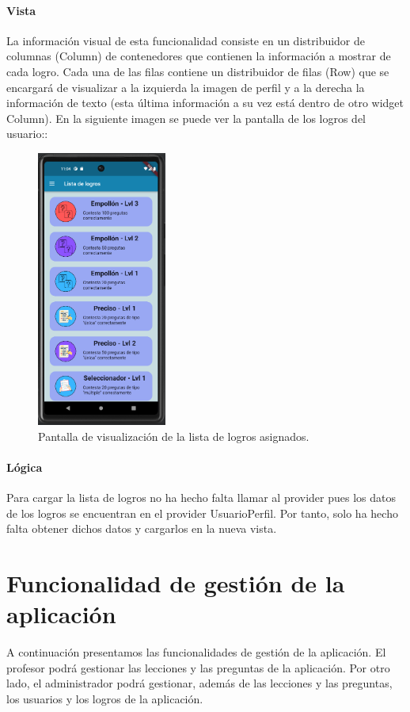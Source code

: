 \paragraph*{Vista}
La información visual de esta funcionalidad consiste en un distribuidor de columnas (Column) de contenedores que contienen la información a mostrar de cada logro. 
Cada una de las filas contiene un distribuidor de filas (Row) que se encargará de visualizar a la izquierda la imagen de perfil y
 a la derecha la información de texto (esta última información a su vez está dentro de otro widget Column). 
 En la siguiente imagen se puede ver la pantalla de los logros del usuario:: 


\begin{figure}[H]
  \centering
  \includegraphics[width=0.38\textwidth]{imagenes/c7/listalogrosperfil.png}
  \caption{Pantalla de visualización de la lista de logros asignados.} 
  \label{fig:ver_logros_perfil}
\end{figure}



\paragraph*{Lógica}
Para cargar la lista de logros no ha hecho falta llamar al provider pues los datos de los logros se encuentran en el provider UsuarioPerfil.
Por tanto, solo ha hecho falta obtener dichos datos y cargarlos en la nueva vista.


\section{Funcionalidad de gestión de la aplicación}
A continuación presentamos las funcionalidades de gestión de la aplicación. 
El profesor podrá gestionar las lecciones y las preguntas de la aplicación. 
Por otro lado, el administrador podrá gestionar, además de las lecciones y las preguntas, los usuarios y los logros de la aplicación.

